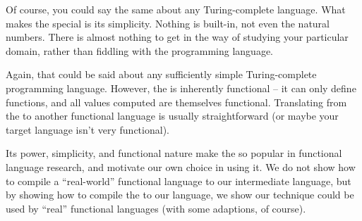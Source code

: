\documentclass[12pt]{report}
\begin{document}
Of course, you could say the same about any Turing-complete
language. What makes the \lamA special is its simplicity. Nothing is
built-in, not even the natural numbers. There is almost nothing to get
in the way of studying your particular domain, rather than fiddling
with the programming language.

Again, that could be said about any sufficiently simple
Turing-complete programming language. However, the \lamA is inherently
functional -- it can only define functions, and all values computed
are themselves functional. Translating from the \lamA to
another functional language is usually straightforward (or maybe your
target language isn't very functional). 

Its power, simplicity, and functional nature make the \lamA so popular
in functional language research, and motivate our own choice in using
it. We do not show how to compile a ``real-world'' functional language
to our intermediate language, but by showing how to compile the 
\lamA to our language, we show our technique could be used by ``real'' 
functional languages (with some adaptions, of course).







\end{document}
